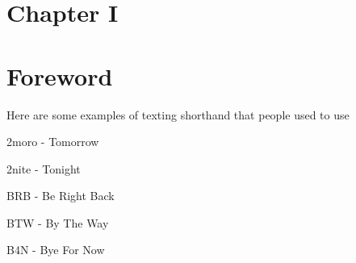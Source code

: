 \documentclass[12pt]{report}
\begin{document}
\vspace{\baselineskip}

\vspace{\baselineskip}

\vspace{\baselineskip}

\vspace{\baselineskip}

\vspace{\baselineskip}



\newpage

\vspace{\baselineskip}
\vspace{\baselineskip}
\section*{Chapter I}
\section*{Foreword}
Here are some examples of texting shorthand that people used to use\par


\vspace{\baselineskip}
\begin{adjustwidth}{0.5in}{0.0in}
2moro - Tomorrow\par

\end{adjustwidth}

\begin{adjustwidth}{0.5in}{0.0in}
2nite - Tonight\par

\end{adjustwidth}

\begin{adjustwidth}{0.5in}{0.0in}
BRB - Be Right Back\par

\end{adjustwidth}

\begin{adjustwidth}{0.5in}{0.0in}
BTW - By The Way\par

\end{adjustwidth}

\begin{adjustwidth}{0.5in}{0.0in}
B4N - Bye For Now\par

\end{adjustwidth}
\end{document}
